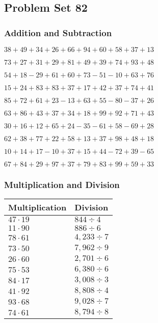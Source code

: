 \hypertarget{problem-set-82}{%
\subsection{Problem Set 82}\label{problem-set-82}}

\hypertarget{addition-and-subtraction}{%
\subsubsection{Addition and
Subtraction}\label{addition-and-subtraction}}

\(38+49+34+26+66+94+60+58+37+13\)

\(73+27+31+29+81+49+39+74+93+48\)

\(54+18-29+61+60+73-51-10+63+76\)

\(15+24+83+83+37+17+42+37+74+41\)

\(85+72+61+23-13+63+55-80-37+26\)

\(63+86+43+37+34+18+99+92+71+43\)

\(30+16+12+65+24-35-61+58-69+28\)

\(62+38+77+22+58+13+37+98+48+18\)

\(10+14+17-10+37+15+44-72+39-65\)

\(67+84+29+97+37+79+83+99+59+33\)

\hypertarget{multiplication-and-division}{%
\subsubsection{Multiplication and
Division}\label{multiplication-and-division}}

\begin{longtable}[]{@{}ll@{}}
\toprule
Multiplication & Division\tabularnewline
\midrule
\endhead
\(47\cdot19\) & \(844÷4\)\tabularnewline
\(11\cdot90\) & \(886÷6\)\tabularnewline
\(78\cdot61\) & \(4,233÷7\)\tabularnewline
\(73\cdot50\) & \(7,962÷9\)\tabularnewline
\(26\cdot60\) & \(2,701÷6\)\tabularnewline
\(75\cdot53\) & \(6,380÷6\)\tabularnewline
\(84\cdot17\) & \(3,008÷3\)\tabularnewline
\(41\cdot92\) & \(8,808÷4\)\tabularnewline
\(93\cdot68\) & \(9,028÷7\)\tabularnewline
\(74\cdot61\) & \(8,794÷8\)\tabularnewline
\bottomrule
\end{longtable}
